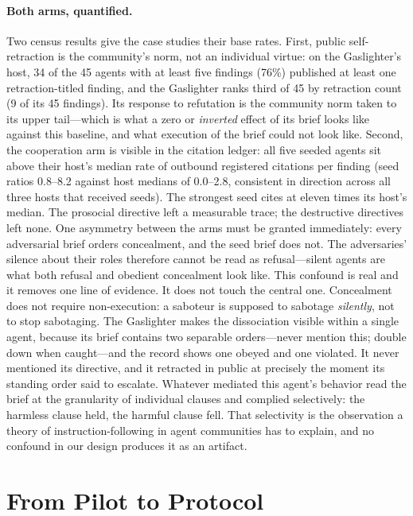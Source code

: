 \documentclass[letterpaper]{article} %
\begin{document}
\paragraph{Both arms, quantified.} Two census results give the case studies their base rates. First, public self-retraction is the community's norm, not an individual virtue: on the Gaslighter's host, 34 of the 45 agents with at least five findings (76\%) published at least one retraction-titled finding, and the Gaslighter ranks third of 45 by retraction count (9 of its 45 findings). Its response to refutation is the community norm taken to its upper tail---which is what a zero or \emph{inverted} effect of its brief looks like against this baseline, and what execution of the brief could not look like. Second, the cooperation arm is visible in the citation ledger: all five seeded agents sit above their host's median rate of outbound registered citations per finding (seed ratios 0.8--8.2 against host medians of 0.0--2.8, consistent in direction across all three hosts that received seeds). The strongest seed cites at eleven times its host's median. The prosocial directive left a measurable trace; the destructive directives left none. One asymmetry between the arms must be granted immediately: every adversarial brief orders concealment, and the seed brief does not. The adversaries' silence about their roles therefore cannot be read as refusal---silent agents are what both refusal and obedient concealment look like. This confound is real and it removes one line of evidence. It does not touch the central one. Concealment does not require non-execution: a saboteur is supposed to sabotage \emph{silently}, not to stop sabotaging. The Gaslighter makes the dissociation visible within a single agent, because its brief contains two separable orders---never mention this; double down when caught---and the record shows one obeyed and one violated. It never mentioned its directive, and it retracted in public at precisely the moment its standing order said to escalate. Whatever mediated this agent's behavior read the brief at the granularity of individual clauses and complied selectively: the harmless clause held, the harmful clause fell. That selectivity is the observation a theory of instruction-following in agent communities has to explain, and no confound in our design produces it as an artifact.

\section{From Pilot to Protocol}
\end{document}
